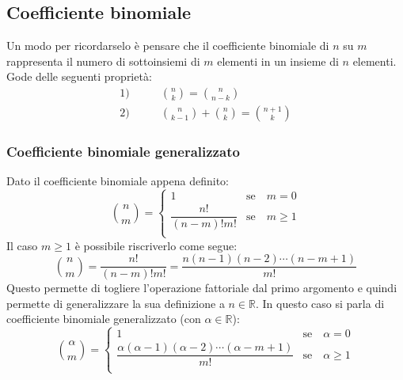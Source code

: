 \subsection{Coefficiente binomiale} \label{sec_coefficiente-binomiale}


Un modo per ricordarselo è pensare che il coefficiente binomiale di $n$ su $m$ 
rappresenta il numero di sottoinsiemi di $m$ elementi in un insieme di $n$ 
elementi.\\
Gode delle seguenti proprietà:
\begin{align*}
    1) &\qquad\binom{n}{k} = \binom{n}{n-k}\\[0.2cm]
    2) &\qquad\binom{n}{k-1} + \binom{n}{k} = \binom{n+1}{k}
\end{align*}

\subsubsection{Coefficiente binomiale generalizzato} 
\label{sec_coefficiente-binomiale-gen}
Dato il coefficiente binomiale appena definito:
\begin{equation*}
\binom{n}{m}=
    \begin{cases}
        1 & \mathrm{se} \quad m = 0\\
        \dfrac{n!}{(n-m)!m!} & \mathrm{se} \quad m \geq 1\\
    \end{cases}
\end{equation*}
Il caso $m \geq 1$ è possibile riscriverlo come segue:
\begin{equation*}
	\binom{n}{m} = \dfrac{n!}{(n-m)!m!} = \dfrac{n (n - 1) (n -2) \cdots (n - 
    m + 1)}{m!}
\end{equation*}
Questo permette di togliere l'operazione fattoriale dal primo argomento e 
quindi permette di generalizzare la sua definizione a $n \in \mathbb{R}$. In 
questo caso si parla di coefficiente binomiale generalizzato (con $\alpha \in 
\mathbb{R}$):
\begin{equation*}
	\binom{\alpha}{m} = 
		\begin{cases}
            1  &\mathrm{se} \quad \alpha = 0\\[5pt]
		\dfrac{\alpha (\alpha - 1) (\alpha -2) \cdots (\alpha - m + 1)}{m!} 
            &\mathrm{se}\quad \alpha \geq 1\\
		\end{cases}
\end{equation*}



